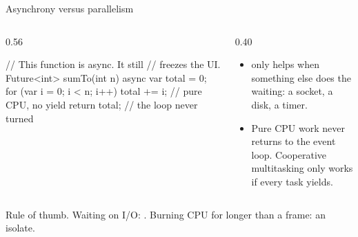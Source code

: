 \documentclass[10pt,aspectratio=169,t]{beamer}
\begin{document}
\begin{frame}[fragile,eyebrow=Foundations]{Asynchrony versus parallelism}
  \begin{columns}[T]
    \begin{column}{0.56\textwidth}
\begin{dart}
// This function is async. It still
// freezes the UI.
Future<int> sumTo(int n) async {
  var total = 0;
  for (var i = 0; i < n; i++) {
    total += i;   // pure CPU, no yield
  }
  return total;   // the loop never turned
}
\end{dart}
    \end{column}
    \begin{column}{0.40\textwidth}
      \begin{itemize}
        \item {} only helps when something else does the waiting: a socket, a disk, a timer.
        \item Pure CPU work never returns to the event loop. Cooperative multitasking only works if every task yields.
      \end{itemize}
    \end{column}
  \end{columns}
  \begin{takeaway}{Rule of thumb.}
    Waiting on I/O: . Burning CPU for longer than a frame: an isolate.
  \end{takeaway}
\end{frame}

\end{document}

